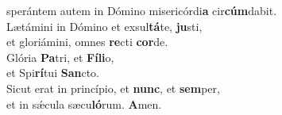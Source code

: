 \oddverse sperántem autem in Dómino misericórdi\textbf{a} cir\textbf{cúm}dabit.\\
\evenverse Lætámini in Dómino et exsul\textbf{tá}te, \textbf{ju}sti,~\*\\
\evenverse et gloriámini, omnes \textbf{re}cti \textbf{cor}de.\\
\oddverse Glória \textbf{Pa}tri, et \textbf{Fí}\textbf{li}o,~\*\\
\oddverse et Spi\textbf{rí}tui \textbf{San}cto.\\
\evenverse Sicut erat in princípio, et \textbf{nunc}, et \textbf{sem}per,~\*\\
\evenverse et in sǽcula sæcu\textbf{ló}rum. \textbf{A}men.\\
